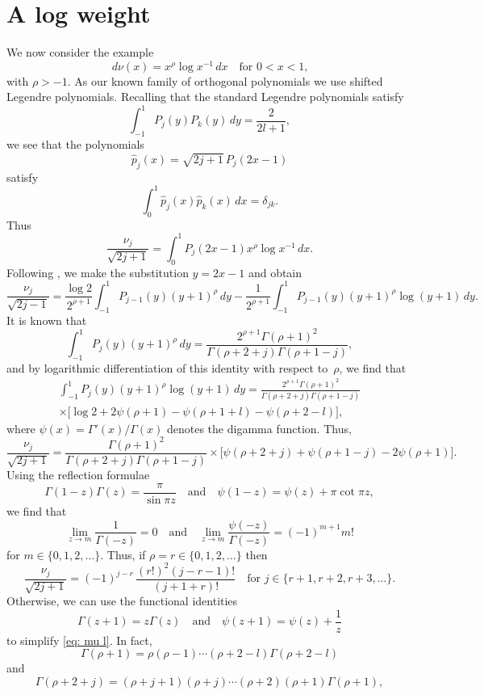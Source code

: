 \documentclass[12pt,a4paper]{article}
\begin{document}
\section{A log weight}
We now consider the example
\[
d\nu(x)=x^\rho\log x^{-1}\,dx\quad\text{for $0<x<1$,}
\]
with $\rho>-1$.  As our known family of orthogonal polynomials we 
use shifted Legendre polynomials.  Recalling that the standard 
Legendre polynomials satisfy
\[
\int_{-1}^1P_j(y)P_k(y)\,dy=\frac{2}{2l+1},
\]
we see that the polynomials
\[
\hat p_j(x)=\sqrt{2j+1}\,P_j(2x-1)
\]
satisfy
\[
\int_0^1\hat p_j(x)\hat p_k(x)\,dx=\delta_{jk}.
\]
Thus
\[
\frac{\nu_j}{\sqrt{2j+1}}=\int_0^1 P_j(2x-1)x^\rho\log x^{-1}\,dx.
\]
Following \cite{Gautschi1979}, we make the substitution $y=2x-1$
and obtain
\[
\frac{\nu_j}{\sqrt{2j-1}}=\frac{\log 2}{2^{\rho+1}}\int_{-1}^1
	P_{j-1}(y)(y+1)^\rho\,dy
	-\frac{1}{2^{\rho+1}}\int_{-1}^1 P_{j-1}(y)(y+1)^\rho\log(y+1)\,dy.
\]
It is known that
\[
\int_{-1}^1 P_j(y)(y+1)^\rho\,dy
	=\frac{2^{\rho+1}\Gamma(\rho+1)^2}%
{\Gamma(\rho+2+j)\Gamma(\rho+1-j)},
\]
and by logarithmic differentiation of this identity with respect 
to~$\rho$, we find that
\begin{multline*}
\int_{-1}^1 P_j(y)(y+1)^\rho\log(y+1)\,dy
	=\frac{2^{\rho+1}\Gamma(\rho+1)^2}%
{\Gamma(\rho+2+j)\Gamma(\rho+1-j)}\\
	\times\bigl[\log2+2\psi(\rho+1)-\psi(\rho+1+l)-\psi(\rho+2-l)
	\bigr],
\end{multline*}
where $\psi(x)=\Gamma'(x)/\Gamma(x)$ denotes the digamma function.
Thus,
\begin{equation}\label{eq: mu l}
\frac{\nu_j}{\sqrt{2j+1}}
	=\frac{\Gamma(\rho+1)^2}{\Gamma(\rho+2+j)\Gamma(\rho+1-j)}
	\times\bigl[\psi(\rho+2+j)+\psi(\rho+1-j)-2\psi(\rho+1)\bigr].
\end{equation}
Using the reflection formulae
\[
\Gamma(1-z)\Gamma(z)=\frac{\pi}{\sin\pi z}
\quad\text{and}\quad
\psi(1-z)=\psi(z)+\pi\cot\pi z,
\]
we find that
\[
\lim_{z\to m}\frac{1}{\Gamma(-z)}=0
\quad\text{and}\quad
\lim_{z\to m}\frac{\psi(-z)}{\Gamma(-z)}=(-1)^{m+1}m!
\]
for $m\in\{0,1,2,\dots\}$.  Thus, if $\rho=r\in\{0,1,2,\dots\}$
then
\[
\frac{\nu_j}{\sqrt{2j+1}}=(-1)^{j-r}\,\frac{(r!)^2(j-r-1)!}{(j+1+r)!}
	\quad\text{for $j\in\{r+1, r+2, r+3, \dots\}$.}
\]
Otherwise, we can use the functional identities
\[
\Gamma(z+1)=z\Gamma(z)\quad\text{and}\quad
\psi(z+1)=\psi(z)+\frac{1}{z}
\]
to simplify \eqref{eq: mu l}.  In fact,
\[
\Gamma(\rho+1)=\rho(\rho-1)\cdots(\rho+2-l)\Gamma(\rho+2-l)
\]
and
\[
\Gamma(\rho+2+j)=(\rho+j+1)(\rho+j)\cdots(\rho+2)(\rho+1)
	\Gamma(\rho+1),
\]
\end{document}
